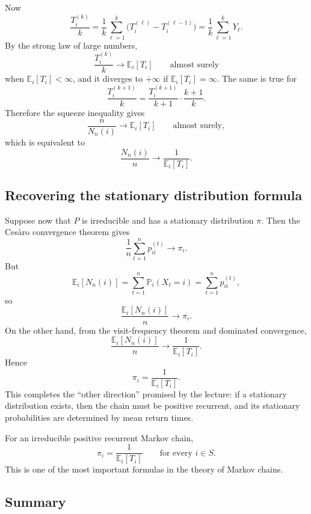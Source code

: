 \documentclass[11pt]{article}
\theoremstyle{definition}
\begin{document}
Now
\[
\frac{T_i^{(k)}}{k}
=
\frac1k\sum_{\ell=1}^{k}\bigl(T_i^{(\ell)}-T_i^{(\ell-1)}\bigr)
=
\frac1k\sum_{\ell=1}^{k}Y_\ell.
\]
By the strong law of large numbers,
\[
\frac{T_i^{(k)}}{k}
\to
\mathbb E_i[T_i]
\qquad \text{almost surely}
\]
when \(\mathbb E_i[T_i]<\infty\), and it diverges to \(+\infty\) if \(\mathbb E_i[T_i]=\infty\). The same is true for
\[
\frac{T_i^{(k+1)}}{k}
=
\frac{T_i^{(k+1)}}{k+1}\cdot\frac{k+1}{k}.
\]
Therefore the squeeze inequality gives
\[
\frac{n}{N_n(i)}\to \mathbb E_i[T_i]
\qquad \text{almost surely},
\]
which is equivalent to
\[
\frac{N_n(i)}{n}
\to
\frac{1}{\mathbb E_i[T_i]}.
\]

\subsection{Recovering the stationary distribution formula}

Suppose now that \(P\) is irreducible and has a stationary distribution \(\pi\). Then the Ces\`aro convergence theorem gives
\[
\frac1n\sum_{t=1}^{n} p_{ii}^{(t)} \to \pi_i.
\]
But
\[
\mathbb E_i[N_n(i)]
=
\sum_{t=1}^{n}\mathbb P_i(X_t=i)
=
\sum_{t=1}^{n} p_{ii}^{(t)},
\]
so
\[
\frac{\mathbb E_i[N_n(i)]}{n}
\to \pi_i.
\]
On the other hand, from the visit-frequency theorem and dominated convergence,
\[
\frac{\mathbb E_i[N_n(i)]}{n}
\to
\frac{1}{\mathbb E_i[T_i]}.
\]
Hence
\[
\pi_i = \frac{1}{\mathbb E_i[T_i]}.
\]
This completes the ``other direction'' promised by the lecture: if a stationary distribution exists, then the chain must be positive recurrent, and its stationary probabilities are determined by mean return times.

\begin{keyformula}
For an irreducible positive recurrent Markov chain,
\[
\pi_i = \frac{1}{\mathbb E_i[T_i]}
\qquad \text{for every } i\in S.
\]
This is one of the most important formulas in the theory of Markov chains.
\end{keyformula}

\subsection{Summary}
\end{document}
